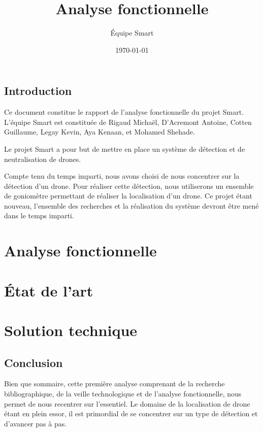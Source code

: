 \documentclass[a4paper, 11pt, oneside]{memoir}
\title{Analyse fonctionnelle}
\author{Équipe Smart}
\date{\today}
\newcounter{rem}[chapter]
\newcounter{th}[chapter]
\begin{document}
\maketitle
\thispagestyle{empty}
\newpage

\tableofcontents

\newpage

\chapter*{Introduction}

Ce document constitue le rapport de l'analyse fonctionnelle du projet Smart.
L'équipe Smart est constituée de Rigaud Michaël, D'Acremont Antoine, Cotten Guillaume, Legay Kevin, Aya Kenaan, et Mohamed Shehade.

Le projet Smart a pour but de mettre en place un système de détection et de neutralisation de drones.

Compte tenu du temps imparti, nous avons choisi de nous concentrer sur la détection d'un drone. Pour réaliser cette détection, nous utiliserons un ensemble de goniomètre permettant de réaliser la localisation d'un drone. Ce projet étant nouveau, l'ensemble des recherches et la réalisation du système devront être mené dans le temps imparti.

\newpage


\part{Analyse fonctionnelle}



\part{État de l'art}



\part{Solution technique}



\chapter*{Conclusion}
Bien que sommaire, cette première analyse comprenant de la recherche bibliographique, de la veille technologique et de l'analyse fonctionnelle, nous permet de nous recentrer sur l'essentiel. Le domaine de la localisation de drone étant en plein essor, il est primordial de se concentrer sur un type de détection et d'avancer pas à pas.
\end{document}
